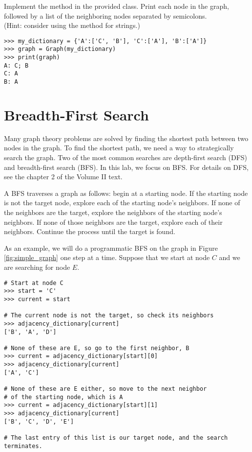 \begin{problem}
Implement the  method in the provided  class.
Print each node in the graph, followed by a list of the neighboring nodes separated by semicolons.
\\(Hint: consider using the  method for strings.)

\begin{lstlisting}
>>> my_dictionary = {'A':['C', 'B'], 'C':['A'], 'B':['A']}
>>> graph = Graph(my_dictionary)
>>> print(graph)
A: C; B
C: A
B: A
\end{lstlisting}
\end{problem}

\section*{Breadth-First Search}

Many graph theory problems are solved by finding the shortest path between two nodes in the graph.
To find the shortest path, we need a way to strategically search the graph.
Two of the most common searches are depth-first search (DFS) and breadth-first search (BFS).
In this lab, we focus on BFS.
For details on DFS, see the chapter 2 of the Volume II text.

A BFS traverses a graph as follows: begin at a starting node.
If the starting node is not the target node, explore each of the starting node's neighbors.
If none of the neighbors are the target, explore the neighbors of the starting node's neighbors.
If none of those neighbors are the target, explore each of their neighbors.
Continue the process until the target is found.

As an example, we will do a programmatic BFS on the graph in Figure \ref{fig:simple_graph} one step at a time.
Suppose that we start at node $C$ and we are searching for node $E$.

\begin{lstlisting}
# Start at node C
>>> start = 'C'
>>> current = start

# The current node is not the target, so check its neighbors
>>> adjacency_dictionary[current]
['B', 'A', 'D']

# None of these are E, so go to the first neighbor, B
>>> current = adjacency_dictionary[start][0]
>>> adjacency_dictionary[current]
['A', 'C']

# None of these are E either, so move to the next neighbor
# of the starting node, which is A
>>> current = adjacency_dictionary[start][1]
>>> adjacency_dictionary[current]
['B', 'C', 'D', 'E']

# The last entry of this list is our target node, and the search terminates.
\end{lstlisting}

